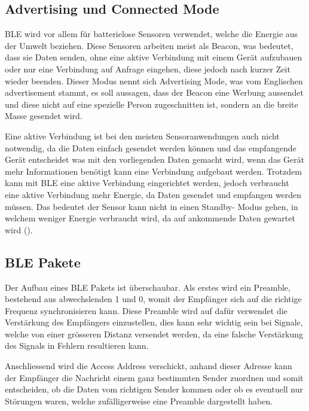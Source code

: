 \subsection{Advertising und Connected Mode}
BLE wird vor allem für batterielose Sensoren verwendet, welche die Energie aus der Umwelt beziehen. Diese Sensoren arbeiten meist als Beacon, was bedeutet, dass sie Daten senden, ohne eine aktive Verbindung mit einem Gerät aufzubauen oder nur eine Verbindung auf Anfrage eingehen, diese jedoch nach kurzer Zeit wieder beenden. Dieser Modus nennt sich Advertising Mode, was vom Englischen advertisement stammt, es soll aussagen, dass der Beacon eine Werbung aussendet und diese nicht auf eine spezielle Person zugeschnitten ist, sondern an die breite Masse gesendet wird.

Eine aktive Verbindung ist bei den meisten Sensoranwendungen auch nicht notwendig, da die Daten einfach gesendet werden können und das empfangende Gerät entscheidet was mit den vorliegenden Daten gemacht wird, wenn das Gerät mehr Informationen benötigt kann eine Verbindung aufgebaut werden. Trotzdem kann mit BLE eine aktive Verbindung eingerichtet werden, jedoch verbraucht eine aktive Verbindung mehr Energie, da Daten gesendet und empfangen werden müssen. Das bedeutet der Sensor kann nicht in einen Standby- Modus gehen, in welchem weniger Energie verbraucht wird, da auf ankommende Daten gewartet wird (\cite{BLE_advertising}).

\subsection{BLE Pakete}

Der Aufbau eines BLE Pakets ist überschaubar. Als erstes wird ein Preamble, bestehend aus abwechslenden 1 und 0, womit der Empfänger sich auf die richtige Frequenz synchronisieren kann. Diese Preamble wird auf dafür verwendet die Verstärkung des Empfängers einzustellen, dies kann sehr wichtig sein bei Signale, welche von einer grösseren Distanz versendet werden, da eine falsche Verstärkung des Signals in Fehlern resultieren kann.

Anschliessend wird die Access Address verschickt, anhand dieser Adresse kann der Empfänger die Nachricht einem ganz bestimmten Sender zuordnen und somit entscheiden, ob die Daten vom richtigen Sender kommen oder ob es eventuell nur Störungen waren, welche zufälligerweise eine Preamble dargestellt haben.

